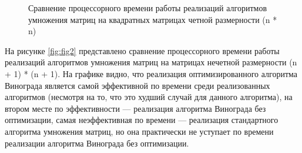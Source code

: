 \begin{figure}[h!]
	
	
	\caption{Сравнение процессорного времени работы реализаций алгоритмов умножения матриц на квадратных матрицах четной размерности (n * n)}
	
	\label{fig:fig1}
	
\end{figure}

\clearpage
На рисунке \ref{fig:fig2} представлено сравнение процессорного времени работы реализаций алгоритмов умножения матриц на матрицах нечетной размерности (n + 1) * (n + 1). 
На графике видно, что реализация оптимизированного алгоритма Винограда является самой эффективной по времени среди реализованных алгоритмов (несмотря на то, что это худший случай для данного алгоритма), на втором месте по эффективности --- реализация алгоритма Винограда без оптимизации, самая неэффективная по времени --- реализация стандартного алгоритма умножения матриц, но она практически не уступает по времени реализации алгоритма Винограда без оптимизации.
\\
\\
\\
\\
\\
\\
\\

